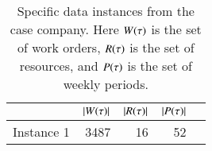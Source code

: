 \begin{table}[H]
\centering
\begin{tabular}{lrrrr}
\toprule
           & $|W(\tau)|$ & $|R(\tau)|$ & $|P(\tau)|$ \\ \midrule
Instance 1 & 3487                & 16               & 52             \\ \bottomrule
\end{tabular}

\caption{Specific data instances from the case company. Here $\SetWorkOrder$ is the set of work orders, $R(\tau)$ is the set of resources, and $P(\tau)$ is the set of weekly periods.} %
\end{table}

